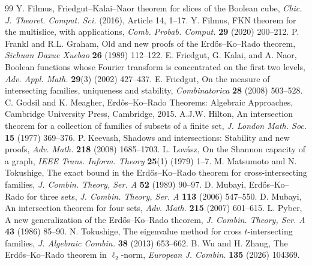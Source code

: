 \documentclass[10pt,a4paper]{amsart}
\numberwithin{equation}{section}
\begin{document}
\begin{thebibliography}{99}
 Y. Filmus, Friedgut--Kalai--Naor theorem for slices of the Boolean cube, {\em Chic. J. Theoret. Comput. Sci.} (2016), Article 14, 1--17.
 Y. Filmus, FKN theorem for the multislice, with applications, {\em Comb. Probab. Comput.} {\bf 29} (2020) 200--212.
 P. Frankl and R.L. Graham, Old and new proofs of the Erd\H{o}s--Ko--Rado theorem, {\em Sichuan Daxue Xuebao} {\bf 26} (1989) 112--122.
 E. Friedgut, G. Kalai, and A. Naor, Boolean functions whose Fourier transform is concentrated on the first two levels, {\em Adv. Appl. Math.} {\bf 29}(3) (2002) 427--437.
 E. Friedgut, On the measure of intersecting families, uniqueness and stability, {\em Combinatorica} {\bf 28} (2008) 503--528.
 C. Godsil and K. Meagher, Erd\H{o}s--Ko--Rado Theorems: Algebraic Approaches, Cambridge University Press, Cambridge, 2015.
 A.J.W. Hilton, An intersection theorem for a collection of families of subsets of a finite set, {\em J. London Math. Soc.} {\bf 15} (1977) 369--376.
 P. Keevash, Shadows and intersections: Stability and new proofs, {\em Adv. Math.} {\bf 218} (2008) 1685--1703.
 L. Lov\'asz, On the Shannon capacity of a graph, {\em IEEE Trans. Inform. Theory} {\bf 25}(1) (1979) 1--7.
 M. Matsumoto and N. Tokushige, The exact bound in the Erd\H{o}s--Ko--Rado theorem for cross-intersecting families, {\em J. Combin. Theory, Ser. A} {\bf 52} (1989) 90--97.
 D. Mubayi, Erd\H{o}s--Ko--Rado for three sets, {\em J. Combin. Theory, Ser. A} {\bf 113} (2006) 547--550.
 D. Mubayi, An intersection theorem for four sets, {\em Adv. Math.} {\bf 215} (2007) 601--615.
 L. Pyber, A new generalization of the Erd\H{o}s--Ko--Rado theorem, {\em J. Combin. Theory, Ser. A} {\bf 43} (1986) 85--90.
 N. Tokushige, The eigenvalue method for cross $t$-intersecting families, {\em J. Algebraic Combin.} {\bf 38} (2013) 653--662.
 B. Wu and H. Zhang, The Erd\H{o}s--Ko--Rado theorem in $\ell_2$-norm, {\em European J. Combin.} {\bf 135} (2026) 104369.
\end{thebibliography}
\end{document}
